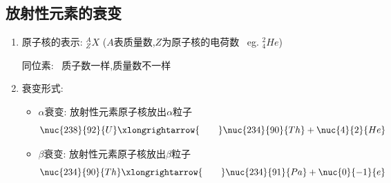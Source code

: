 \documentclass{article}
\begin{document}
\vspace{2em}

\subsection{放射性元素的衰变}
\begin{enumerate}
    \item 原子核的表示: $_{Z}^{A}X$ \quad ($A$表质量数,$Z$为原子核的电荷数 \, eg. $_{4}^{2}He$)

          \vspace{-1em}
          \begin{adjustbox}{minipage=0.32\linewidth, bgcolor=gray!20, padding=1em}
              \small
              同位素: \, 质子数一样,质量数不一样
          \end{adjustbox}
          \vspace{-1em}

    \item 衰变形式:
          \begin{itemize}
              \item[] $\alpha$衰变: 放射性元素原子核放出$\alpha$粒子
                  $$
                      \nuc{238}{92}{U} \xlongrightarrow{\quad\quad} \nuc{234}{90}{Th}  + \nuc{4}{2}{He}
                  $$
              \item[] $\beta$衰变: 放射性元素原子核放出$\beta$粒子
                  $$
                      \nuc{234}{90}{Th} \xlongrightarrow{\quad\quad}  \nuc{234}{91}{Pa}+ \nuc{0}{-1}{e}
                  $$
          \end{itemize}
\end{enumerate}
\end{document}
